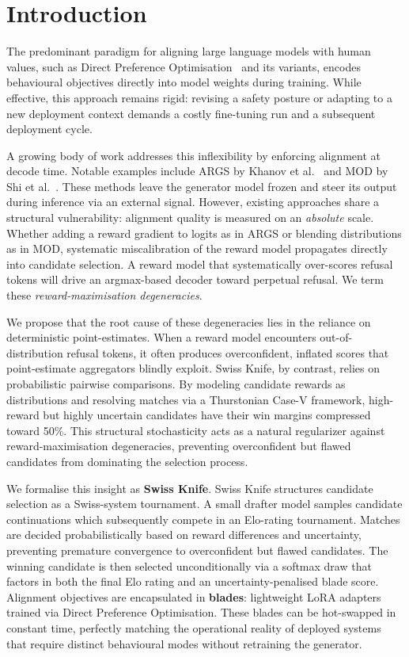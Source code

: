 \documentclass[letterpaper]{article} %
\begin{document}
\section{Introduction}

The predominant paradigm for aligning large language models with human values, such as Direct Preference Optimisation~\cite{rafailov2023direct} and its variants, encodes behavioural objectives directly into model weights during training. While effective, this approach remains rigid: revising a safety posture or adapting to a new deployment context demands a costly fine-tuning run and a subsequent deployment cycle.

A growing body of work addresses this inflexibility by enforcing alignment at decode time. Notable examples include ARGS by Khanov et al.~\cite{khanov2024args} and MOD by Shi et al.~\cite{shi2024mod}. These methods leave the generator model frozen and steer its output during inference via an external signal. However, existing approaches share a structural vulnerability: alignment quality is measured on an \emph{absolute} scale. Whether adding a reward gradient to logits as in ARGS or blending distributions as in MOD, systematic miscalibration of the reward model propagates directly into candidate selection. A reward model that systematically over-scores refusal tokens will drive an argmax-based decoder toward perpetual refusal. We term these \emph{reward-maximisation degeneracies}.

We propose that the root cause of these degeneracies lies in the reliance on deterministic point-estimates. When a reward model encounters out-of-distribution refusal tokens, it often produces overconfident, inflated scores that point-estimate aggregators blindly exploit. Swiss Knife, by contrast, relies on probabilistic pairwise comparisons. By modeling candidate rewards as distributions and resolving matches via a Thurstonian Case-V framework, high-reward but highly uncertain candidates have their win margins compressed toward 50\%. This structural stochasticity acts as a natural regularizer against reward-maximisation degeneracies, preventing overconfident but flawed candidates from dominating the selection process.

We formalise this insight as \textbf{Swiss Knife}. Swiss Knife structures candidate selection as a Swiss-system tournament. A small drafter model samples candidate continuations which subsequently compete in an Elo-rating tournament. Matches are decided probabilistically based on reward differences and uncertainty, preventing premature convergence to overconfident but flawed candidates. The winning candidate is then selected unconditionally via a softmax draw that factors in both the final Elo rating and an uncertainty-penalised blade score. Alignment objectives are encapsulated in \textbf{blades}: lightweight LoRA adapters~\cite{hu2021lora} trained via Direct Preference Optimisation. These blades can be hot-swapped in constant time, perfectly matching the operational reality of deployed systems that require distinct behavioural modes without retraining the generator.
\end{document}
